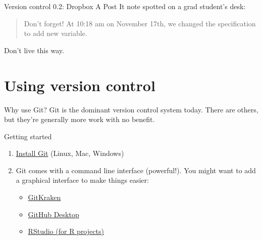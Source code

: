 \documentclass{beamer}
\begin{document}
\begin{frame}{Version control 0.2: Dropbox}
A Post It note spotted on a grad student's desk:
\begin{quote}
	Don't forget! At 10:18 am on November 17th, we changed the specification to add new variable.
\end{quote}
Don't live this way.
\end{frame}

\section{Using version control}

\begin{frame}{Why use Git?}
Git is the dominant version control system today. There are others, but they're generally more work with no benefit.
\end{frame}

\begin{frame}{Getting started}
\begin{enumerate}
\item \href{https://git-scm.com/book/en/v2/Getting-Started-Installing-Git}{Install Git} (Linux, Mac, Windows)
\item Git comes with a command line interface (powerful!). You might want to add a graphical interface to make things easier:
\begin{itemize}
\item \href{https://www.gitkraken.com/}{GitKraken}
\item \href{https://desktop.github.com/}{GitHub Desktop}
\item \href{https://support.rstudio.com/hc/en-us/articles/200532077-Version-Control-with-Git-and-SVN}{RStudio (for R projects)}
\end{itemize}
\end{enumerate}

\end{frame}
\end{document}
